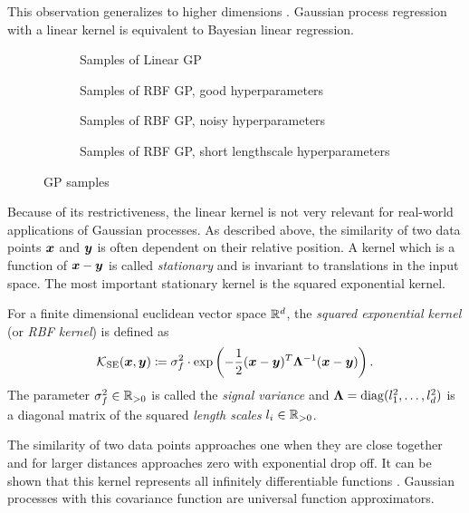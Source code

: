 This observation generalizes to higher dimensions \cite{rasmussen_gaussian_2006}.
Gaussian process regression with a linear kernel is equivalent to Bayesian linear regression.
\begin{figure}[htb]
    \centering
    \begin{subfigure}{\subfigurewidth}
        \caption{Samples of Linear GP}
        \label{fig:gp_samples:linear}
    \end{subfigure}
    \begin{subfigure}{\subfigurewidth}
        \caption{Samples of RBF GP, good hyperparameters}
        \label{fig:gp_samples:rbf_normal}
    \end{subfigure}
    \begin{subfigure}{\subfigurewidth}
        \caption{Samples of RBF GP, noisy hyperparameters}
        \label{fig:gp_samples:rbf_noisy}
    \end{subfigure}
    \begin{subfigure}{\subfigurewidth}
        \caption{Samples of RBF GP, short lengthscale hyperparameters}
        \label{fig:gp_samples:rbf_noisy}
    \end{subfigure}
    \caption{GP samples}
    \label{fig:gp_samples}
\end{figure}

Because of its restrictiveness, the linear kernel is not very relevant for real-world applications of Gaussian processes.
As described above, the similarity of two data points $\bm{x}$ and $\bm{y}$ is often dependent on their relative position.
A kernel which is a function of $\bm{x} - \bm{y}$ is called \emph{stationary} and is invariant to translations in the input space.
The most important stationary kernel is the squared exponential kernel.
\begin{definition}
    For a finite dimensional euclidean vector space $\mathbb{R}^d$, the \emph{squared exponential kernel} (or \emph{RBF kernel}) is defined as
    \begin{align}
        \operatorname{\mathcal{K}}_{\text{SE}}(\bm{x}, \bm{y}) \coloneqq \sigma_f^2 \cdot \exp \left( -\frac{1}{2} (\bm{x} - \bm{y})^T \bm{\Lambda}^{-1} (\bm{x} - \bm{y}) \right).
    \end{align}
    The parameter $\sigma_f^2 \in \mathbb{R}_{>0}$ is called the \emph{signal variance} and $\bm{\Lambda} = \operatorname{diag}(l_1^2, \dots, l_d^2)$ is a diagonal matrix of the squared \emph{length scales} $l_i \in \mathbb{R}_{>0}$.
\end{definition}
The similarity of two data points approaches one when they are close together and for larger distances approaches zero with exponential drop off.
It can be shown that this kernel represents all infinitely differentiable functions \cite{rasmussen_gaussian_2006}.
Gaussian processes with this covariance function are universal function approximators.

